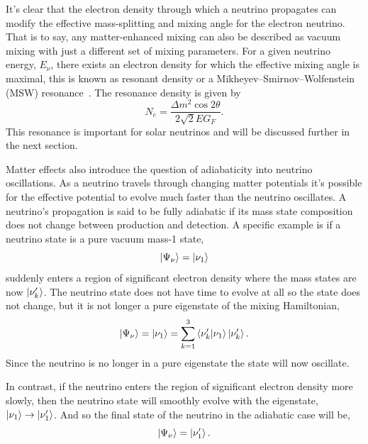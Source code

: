 It's clear that the electron density through which a
neutrino propagates can modify the effective mass-splitting and mixing angle
for the electron neutrino.
That is to say, any matter-enhanced mixing can also be described as vacuum mixing
with just a different set of mixing parameters.
For a given neutrino energy, $E_{\nu}$, there exists an electron density for which
the effective mixing angle is maximal, this is known as resonant density or
a Mikheyev–Smirnov–Wolfenstein (MSW) resonance~\citep{wolfenstein_osc, ms_oscillation}.
The resonance density is given by
\begin{equation}
    N_{e} = \frac{\Delta m^{2} \cos2\theta}{2\sqrt{2}EG_{F}}\text{.}
    \label{eqn:msw_resonance}
\end{equation}
This resonance is important for solar neutrinos and will be discussed further in
the next section.

Matter effects also introduce the question of adiabaticity into neutrino
oscillations.
As a neutrino travels through changing matter potentials it's possible for
the effective potential to evolve much faster than the neutrino oscillates.
A neutrino's propagation is said to be fully adiabatic if its mass state composition
does not change between production and detection.
A specific example is if a neutrino state is a pure vacuum mass-1
state,
\begin{equation*}
    \ket{\Psi_{\nu}} = \ket{\nu_{1}}
\end{equation*}
suddenly enters a region of significant electron density where the mass states
are now $\ket{\nu_{k}^\prime}$.
The neutrino state does not have time to evolve at all so the state
does not change, but it is not longer a pure eigenstate of the mixing
Hamiltonian,
\begin{equation*}
    \ket{\Psi_{\nu}} = \ket{\nu_{1}} = \sum_{k=1}^{3} \braket{\nu_{k}^\prime}{\nu_{1}}\ket{\nu_{k}^\prime}\text{.}
\end{equation*}
Since the neutrino is no longer in a pure eigenstate the state will
now oscillate.

In contrast, if the neutrino enters the region of significant electron
density more slowly, then the neutrino state will smoothly evolve with the
eigenstate, $\ket{\nu_{1}} \rightarrow \ket{\nu_{1}^{\prime}}$.
And so the final state of the neutrino in the adiabatic case will be,
\begin{equation*}
    \ket{\Psi_{\nu}} = \ket{\nu_{1}^{\prime}}\text{.}
\end{equation*}

